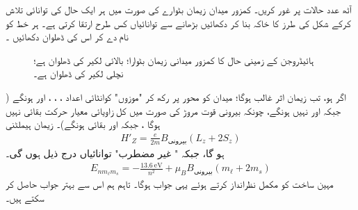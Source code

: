  
 
آٹھ عدد  حالات  پر غور کریں۔ کمزور میدان زیمان بٹوارے   کی صورت میں ہر  ایک حال کی توانائی تلاش کرکے شکل    کی طرز کا خاکہ بنا کر دکھائیں  بڑھانے سے توانائیاں کس طرح ارتقا کرتی ہے۔  ہر خط کو نام دے کر اس کی ڈھلوان دکھائیں ۔
\begin{figure}
\centering
{}
\caption{ہائیڈروجن کے زمینی حال کا کمزور میدانی زیمان بٹوارا؛ بالائی  لکیر   کی ڈھلوان  ہے؛ نچلی لکیر  کی ڈھلوان  ہے۔}
\label{شکل_غیر_تابع_اضطراب_زیمان_بٹوارا_کمزور_میدان}
\end{figure}




اگر  ہو،   تب  زیمان  اثر غالب ہوگا؛  میدان  کو  محور پر رکھ کر  "موزوں" کوانٹائی  اعداد ، ، ، اور  ہونگے  ( جبکہ  اور  نہیں ہونگے،  چونکہ بیرونی قوت مروڑ کی صورت میں کل زاویائی  معیار حرکت بقائی  نہیں ہوگا  ، جبکہ  اور  بقائی  ہونگے)۔  زیمان ہیملٹنی 
\begin{align*}
H'_Z = \frac{e}{2m} B_{\text{بیرونی}} (L_z + 2S_z)
\end{align*}
ہو گا، جبکہ " غیر مضطرب"  توانائیاں  درج ذیل ہوں گی۔ 
\begin{align}\label{مساوات_غیر_مضطرب_طاقتور_زیمان_حصہ}
E_{nm_{\ell}m_s} = - \frac{\SI{13.6}{\electronvolt}}{n^2} + \mu_B B_{\text{بیرونی}} (m_{\ell} + 2m_s)
\end{align}
مہین ساخت کو مکمل نظرانداز کرتے ہوئے یہی جواب ہوگا۔ تاہم ہم  اس سے بہتر  جواب حاصل کر سکتے ہیں۔

